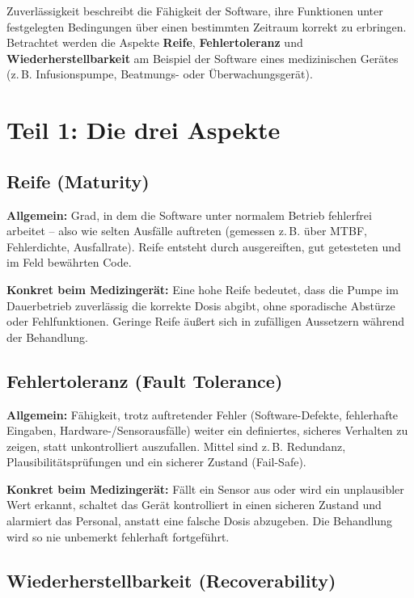 \documentclass[
	fontsize=12pt,          %
	paper=a4,               %
	numbers=noenddot,       %
	listof=totoc,           %
	listof=entryprefix,     %
	listof=nochaptergap,    %
	bibliography=totoc,     %
	parskip=half,           %
	openany                 %
]{scrbook}
\begin{document}
Zuverlässigkeit beschreibt die Fähigkeit der Software, ihre Funktionen unter
festgelegten Bedingungen über einen bestimmten Zeitraum korrekt zu erbringen.
Betrachtet werden die Aspekte \textbf{Reife}, \textbf{Fehlertoleranz} und
\textbf{Wiederherstellbarkeit} am Beispiel der Software eines medizinischen
Gerätes (z.\,B. Infusionspumpe, Beatmungs- oder Überwachungsgerät).

\section*{Teil 1: Die drei Aspekte}

\subsection*{Reife (Maturity)}

\textbf{Allgemein:} Grad, in dem die Software unter normalem Betrieb fehlerfrei
arbeitet -- also wie selten Ausfälle auftreten (gemessen z.\,B. über MTBF,
Fehlerdichte, Ausfallrate).
Reife entsteht durch ausgereiften, gut getesteten und im Feld bewährten Code.

\textbf{Konkret beim Medizingerät:} Eine hohe Reife bedeutet, dass die Pumpe im
Dauerbetrieb zuverlässig die korrekte Dosis abgibt, ohne sporadische Abstürze
oder Fehlfunktionen.
Geringe Reife äußert sich in zufälligen Aussetzern während der Behandlung.

\subsection*{Fehlertoleranz (Fault Tolerance)}

\textbf{Allgemein:} Fähigkeit, trotz auftretender Fehler (Software-Defekte,
fehlerhafte Eingaben, Hardware-/Sensorausfälle) weiter ein definiertes,
sicheres Verhalten zu zeigen, statt unkontrolliert auszufallen.
Mittel sind z.\,B. Redundanz, Plausibilitätsprüfungen und ein sicherer Zustand
(Fail-Safe).

\textbf{Konkret beim Medizingerät:} Fällt ein Sensor aus oder wird ein
unplausibler Wert erkannt, schaltet das Gerät kontrolliert in einen sicheren
Zustand und alarmiert das Personal, anstatt eine falsche Dosis abzugeben.
Die Behandlung wird so nie unbemerkt fehlerhaft fortgeführt.

\subsection*{Wiederherstellbarkeit (Recoverability)}
\end{document}

